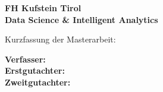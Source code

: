 \thispagestyle{empty}

\textbf{FH Kufstein Tirol\\Data Science \& Intelligent Analytics}

{Kurzfassung der Masterarbeit: \textbf{\mytitle}}

\textbf{Verfasser:} \myname\\
\textbf{Erstgutachter:} \myfirstreviewer\\
\textbf{Zweitgutachter:} \mysecondreviewer\\

\Blindtext[2][1]

\mydate{}

